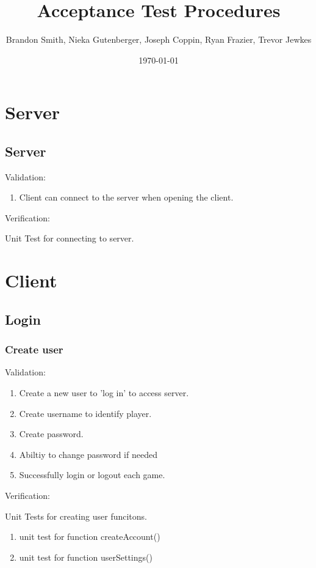 \documentclass[11pt, titlepage]{article}
\author{Brandon Smith, Nieka Gutenberger, Joseph Coppin, Ryan Frazier, Trevor Jewkes}
\title{Acceptance Test Procedures}
\date{\today}
\begin{document}
	\maketitle
	\setcounter{tocdepth}{1}
	\section{Server}
	
		\subsection{Server}
		Validation:
		\begin{enumerate}
			\item Client can connect to the server when opening the client.
		\end{enumerate}
		Verification:
		
		Unit Test for connecting to server.

			
	\section{Client}
	
		\subsection{Login}
			\subsubsection{Create user}
			Validation:
			\begin{enumerate} 
				\item Create a new user to 'log in' to access server.
				\item Create username to identify player.
				\item Create password.
				\item Abiltiy to change password if needed
				\item Successfully login or logout each game.
			\end{enumerate}
			
			Verification:
			
			Unit Tests for creating user funcitons.
			\begin{enumerate}
				\item unit test for function createAccount()			
				\item unit test for function userSettings()
			\end{enumerate}
\end{document}
